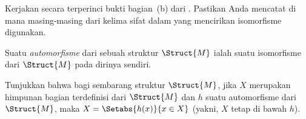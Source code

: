 \documentclass[../../../include/open-logic-section]{subfiles}
\begin{document}
\begin{prob}
Kerjakan secara terperinci bukti bagian~(b) dari
. Pastikan Anda mencatat di mana masing-masing
dari kelima sifat dalam  yang
mencirikan isomorfisme digunakan.
\end{prob}

\begin{defn}
Suatu \emph{automorfisme} dari sebuah struktur $\Struct{M}$ ialah suatu
isomorfisme dari $\Struct{M}$ pada dirinya sendiri.
\end{defn}

\begin{prob}
Tunjukkan bahwa bagi sembarang struktur $\Struct{M}$, jika $X$ merupakan
himpunan bagian terdefinisi dari $\Struct{M}$ dan $h$ suatu automorfisme dari
$\Struct{M}$, maka $X = \Setabs{h(x)}{x \in X}$ (yakni, $X$ tetap di bawah
$h$).
\end{prob}
\end{document}
